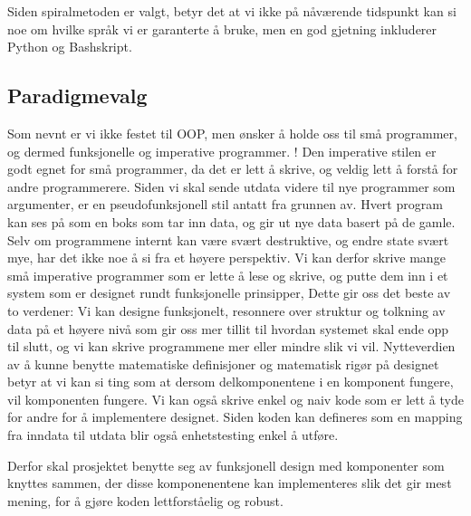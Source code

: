 \documentclass[11pt]{article}
\begin{document}
Siden spiralmetoden er valgt, betyr det at vi ikke på nåværende tidspunkt kan si noe om hvilke språk vi er garanterte å bruke, men en god gjetning inkluderer Python og Bashskript.

\subsection{Paradigmevalg}
Som nevnt er vi ikke festet til OOP, men ønsker å holde oss til små programmer, og dermed funksjonelle og imperative programmer.
!
Den imperative stilen er godt egnet for små programmer, da det er lett å skrive, og veldig lett å forstå for andre programmerere.
Siden vi skal sende utdata videre til nye programmer som argumenter, er en pseudofunksjonell stil antatt fra grunnen av. Hvert program kan ses på som en boks som tar inn data, og gir ut nye data basert på de gamle.
Selv om programmene internt kan være svært destruktive, og endre state svært mye, har det ikke noe å si fra et høyere perspektiv.
Vi kan derfor skrive mange små imperative programmer som er lette å lese og skrive, og putte dem inn i et system som er designet rundt funksjonelle prinsipper,
Dette gir oss det beste av to verdener: Vi kan designe funksjonelt, resonnere over struktur og tolkning av data på et høyere nivå som gir oss mer tillit til hvordan systemet skal ende opp til slutt,
og vi kan skrive programmene mer eller mindre slik vi vil.
Nytteverdien av å kunne benytte matematiske definisjoner og matematisk rigør på designet betyr at vi kan si ting som at dersom delkomponentene i en komponent fungere, vil komponenten fungere.
Vi kan også skrive enkel og naiv kode som er lett å tyde for andre for å implementere designet. Siden koden kan defineres som en mapping fra inndata til utdata blir også enhetstesting enkel å utføre.

Derfor skal prosjektet benytte seg av funksjonell design med komponenter som knyttes sammen, der disse komponenentene kan implementeres slik det gir mest mening, for å gjøre koden lettforståelig og robust.
\end{document}
